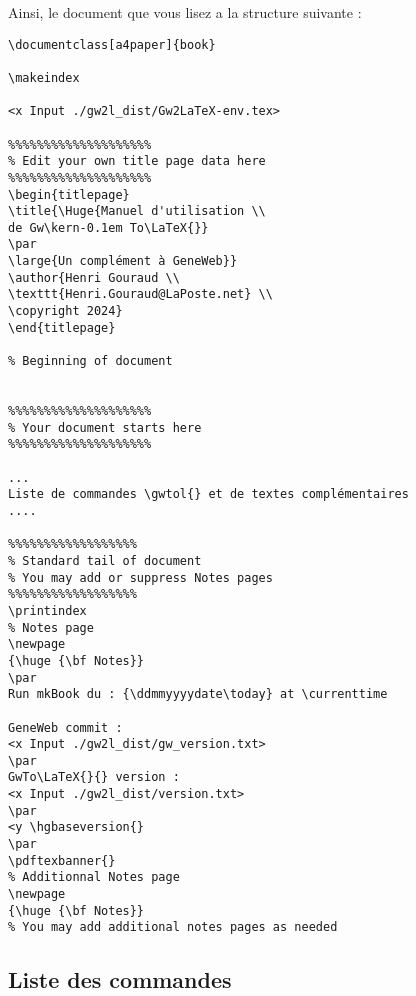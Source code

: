 Ainsi, le document que vous lisez a la structure suivante :

\begin{verbatim}
\documentclass[a4paper]{book}

\makeindex

<x Input ./gw2l_dist/Gw2LaTeX-env.tex>

%%%%%%%%%%%%%%%%%%%%
% Edit your own title page data here
%%%%%%%%%%%%%%%%%%%%
\begin{titlepage}
\title{\Huge{Manuel d'utilisation \\
de Gw\kern-0.1em To\LaTeX{}}
\par
\large{Un complément à GeneWeb}}
\author{Henri Gouraud \\
\texttt{Henri.Gouraud@LaPoste.net} \\
\copyright 2024}
\end{titlepage}

% Beginning of document


%%%%%%%%%%%%%%%%%%%%
% Your document starts here
%%%%%%%%%%%%%%%%%%%%

...
Liste de commandes \gwtol{} et de textes complémentaires
....

%%%%%%%%%%%%%%%%%%
% Standard tail of document
% You may add or suppress Notes pages
%%%%%%%%%%%%%%%%%%
\printindex
% Notes page
\newpage
{\huge {\bf Notes}}
\par
Run mkBook du : {\ddmmyyyydate\today} at \currenttime

GeneWeb commit :
<x Input ./gw2l_dist/gw_version.txt>
\par
GwTo\LaTeX{}{} version :
<x Input ./gw2l_dist/version.txt>
\par
<y \hgbaseversion{}
\par
\pdftexbanner{}
% Additionnal Notes page
\newpage
{\huge {\bf Notes}}
% You may add additional notes pages as needed

\end{verbatim}

\subsection{Liste des commandes \gwtol{}}

